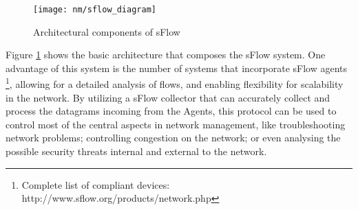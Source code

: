 \begin{figure} [!htbp]
    \centering
    \texttt{[image: nm/sflow\_diagram]}
    \caption{Architectural components of sFlow}
    \label{fig:sflow}
\end{figure}

\par Figure \ref{fig:sflow} shows the basic architecture that composes the sFlow system. One advantage of this system is the number of systems that incorporate sFlow
agents \footnote {Complete list of compliant devices: http://www.sflow.org/products/network.php}, allowing for a detailed analysis of flows, and enabling flexibility
for scalability in the network. By utilizing a sFlow collector that can accurately collect and process the datagrams incoming from the Agents, this protocol can be
used to control most of the central aspects in network management, like troubleshooting network problems; controlling congestion on the network; or even analysing
the possible security threats internal and external to the network.
